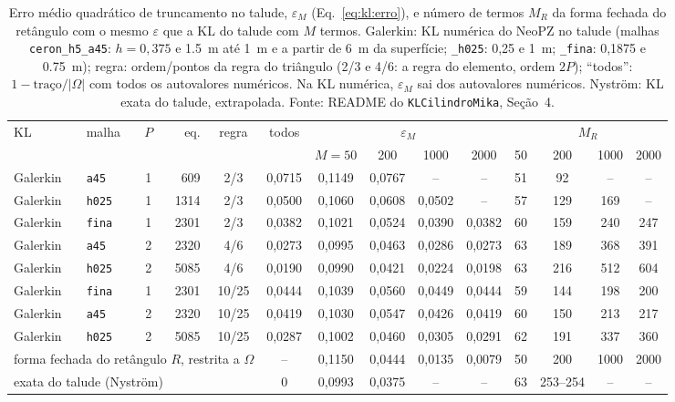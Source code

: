 \begin{table}[H]
  \centering
  \caption{Erro médio quadrático de truncamento no talude, $\varepsilon_M$ (Eq.~\ref{eq:kl:erro}), e número de termos
    $M_R$ da forma fechada do retângulo com o mesmo $\varepsilon$ que a KL do talude com $M$ termos. Galerkin: KL numérica
    do NeoPZ no talude (malhas \texttt{ceron\_h5\_a45}: $h = 0{,}375$ e \SI{1.5}{m} até \SI{1}{m} e a partir de
    \SI{6}{m} da superfície; \texttt{\_h025}: 0,25 e \SI{1}{m}; \texttt{\_fina}: 0,1875 e \SI{0.75}{m}); regra: ordem/pontos
    da regra do triângulo (2/3 e 4/6: a regra do elemento, ordem $2P$); ``todos'': $1 - \text{traço}/|\Omega|$ com todos os
    autovalores numéricos. Na KL numérica, $\varepsilon_M$ sai dos autovalores numéricos. Nyström: KL exata do talude,
    extrapolada. Fonte: README do \texttt{KLCilindroMika}, Seção~4.}
  \label{tab:kl:truncamento}
  \footnotesize
  \setlength{\tabcolsep}{3.6pt}
  \begin{tabular}{llcrcccccccccc}
    \toprule
    KL & malha & $P$ & eq. & regra & todos & \multicolumn{4}{c}{$\varepsilon_M$} & \multicolumn{4}{c}{$M_R$} \\
    \cmidrule(lr){7-10}\cmidrule(lr){11-14}
     & & & & & & $M = 50$ & 200 & 1000 & 2000 & 50 & 200 & 1000 & 2000 \\
    \midrule
    Galerkin & \texttt{a45}  & 1 &  609 & 2/3   & 0,0715 & 0,1149 & 0,0767 & --     & --     & 51 &  92 & --  & --  \\
    Galerkin & \texttt{h025} & 1 & 1314 & 2/3   & 0,0500 & 0,1060 & 0,0608 & 0,0502 & --     & 57 & 129 & 169 & --  \\
    Galerkin & \texttt{fina} & 1 & 2301 & 2/3   & 0,0382 & 0,1021 & 0,0524 & 0,0390 & 0,0382 & 60 & 159 & 240 & 247 \\
    Galerkin & \texttt{a45}  & 2 & 2320 & 4/6   & 0,0273 & 0,0995 & 0,0463 & 0,0286 & 0,0273 & 63 & 189 & 368 & 391 \\
    Galerkin & \texttt{h025} & 2 & 5085 & 4/6   & 0,0190 & 0,0990 & 0,0421 & 0,0224 & 0,0198 & 63 & 216 & 512 & 604 \\
    Galerkin & \texttt{fina} & 1 & 2301 & 10/25 & 0,0444 & 0,1039 & 0,0560 & 0,0449 & 0,0444 & 59 & 144 & 198 & 200 \\
    Galerkin & \texttt{a45}  & 2 & 2320 & 10/25 & 0,0419 & 0,1030 & 0,0547 & 0,0426 & 0,0419 & 60 & 150 & 213 & 217 \\
    Galerkin & \texttt{h025} & 2 & 5085 & 10/25 & 0,0287 & 0,1002 & 0,0460 & 0,0305 & 0,0291 & 62 & 191 & 337 & 360 \\
    \midrule
    \multicolumn{5}{l}{forma fechada do retângulo $R$, restrita a $\Omega$} & -- & 0,1150 & 0,0444 & 0,0135 & 0,0079 & 50 & 200 & 1000 & 2000 \\
    \multicolumn{5}{l}{exata do talude (Nyström)} & 0 & 0,0993 & 0,0375 & -- & -- & 63 & 253--254 & -- & -- \\
    \bottomrule
  \end{tabular}
\end{table}

